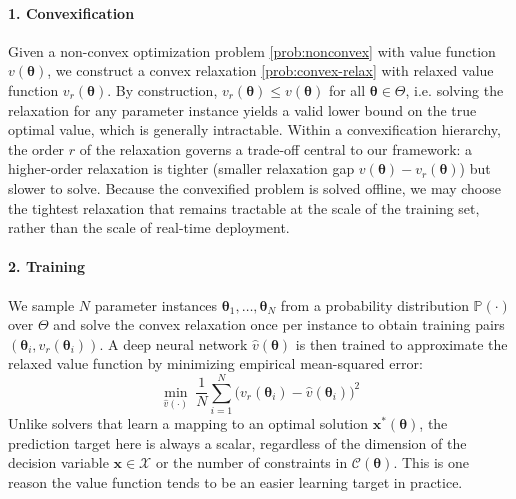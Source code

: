 \documentclass[10pt]{article} %
\theoremstyle{plain}
\theoremstyle{definition}
\theoremstyle{remark}
\begin{document}

\paragraph{1. Convexification} Given a non-convex optimization problem \cref{prob:nonconvex}{}{} with value function $v(\bm{\theta})$, we construct a convex relaxation \cref{prob:convex-relax}{}{} with relaxed value function $v_r(\bm{\theta}).$
By construction, $v_r(\bm{\theta}) \leq v(\bm{\theta})$ for all $\bm{\theta} \in \Theta$, i.e. solving the relaxation for any parameter instance yields a valid lower bound on the true optimal value, which is generally intractable.
Within a convexification hierarchy, the order $r$ of the relaxation governs a trade-off central to our framework: a higher-order relaxation is tighter (smaller relaxation gap $v(\bm{\theta}) - v_r(\bm{\theta})$) but slower to solve. Because the convexified problem is solved offline, we may choose the tightest relaxation that remains tractable at the scale of the training set, rather than the scale of real-time deployment.

\paragraph{2. Training} We sample $N$ parameter instances $\bm{\theta}_1, \ldots, \bm{\theta}_N$ from a probability distribution $\mathbb{P}(\cdot)$ over $\Theta$ and solve the convex relaxation once per instance to obtain training pairs $(\bm{\theta}_i, v_r(\bm{\theta}_i))$. A deep neural network $\hat{v}(\bm{\theta})$ is then trained to approximate the relaxed value function by minimizing empirical mean-squared error:
\begin{equation*}
    \min_{\hat{v}(\cdot)}~ \frac{1}{N} \sum_{i=1}^N \big(v_r(\bm{\theta}_i) - \hat{v}(\bm{\theta}_i)\big)^2
\end{equation*}
Unlike solvers that learn a mapping to an optimal solution $\mathbf{x}^*(\bm{\theta})$, the prediction target here is always a scalar, regardless of the dimension of the decision variable $\mathbf{x} \in \mathcal{X}$ or the number of constraints in $\mathcal{C}(\bm{\theta})$. This is one reason the value function tends to be an easier learning target in practice.
\end{document}
